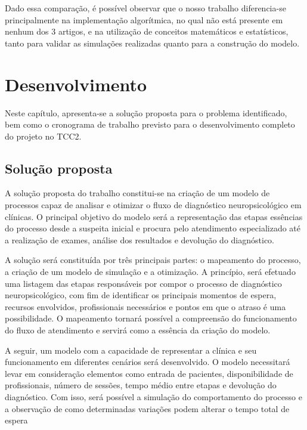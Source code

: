 \documentclass[
    12pt,                %
    openright,           %
    oneside,             %
    a4paper,             %
    english,             %
    brazil               %
]{abntex2}
\begin{document}
Dado essa comparação, é possível observar que o nosso trabalho diferencia-se principalmente na implementação algorítmica, no qual não está presente em nenhum dos 3 artigos, e na utilização de conceitos matemáticos e estatísticos, tanto para validar as simulações realizadas quanto para a construção do modelo.

\chapter{Desenvolvimento}
\label{cap:desenvolvimento}

Neste capítulo, apresenta-se a solução proposta para o problema identificado, bem como o cronograma de trabalho previsto para o desenvolvimento completo do projeto no TCC2.

\section{Solução proposta}
\label{sec:solucao}

A solução proposta do trabalho constitui-se na criação de um modelo de processos capaz de analisar e otimizar o fluxo de diagnóstico neuropsicológico em clínicas. O principal objetivo do modelo será a representação das etapas essências do processo desde a suspeita inicial e procura pelo atendimento especializado até a realização de exames, análise dos resultados e devolução do diagnóstico. 

A solução será constituída por três principais partes: o mapeamento do processo, a criação de um modelo de simulação e a otimização. A princípio, será efetuado uma listagem das etapas responsáveis por compor o processo de diagnóstico neuropsicológico, com fim de identificar os principais momentos de espera, recursos envolvidos, profissionais necessários e pontos em que o atraso é uma possibilidade. O mapeamento tornará possível a compreensão do funcionamento do fluxo de atendimento e servirá como a essência da criação do modelo.

A seguir, um modelo com a capacidade de representar a clínica e seu funcionamento em diferentes cenários será desenvolvido. O modelo necessitará levar em consideração elementos como entrada de pacientes, disponibilidade de profissionais, número de sessões, tempo médio entre etapas e devolução do diagnóstico. Com isso, será possível a simulação do comportamento do processo e a observação de como determinadas variações podem alterar o tempo total de espera
\end{document}
